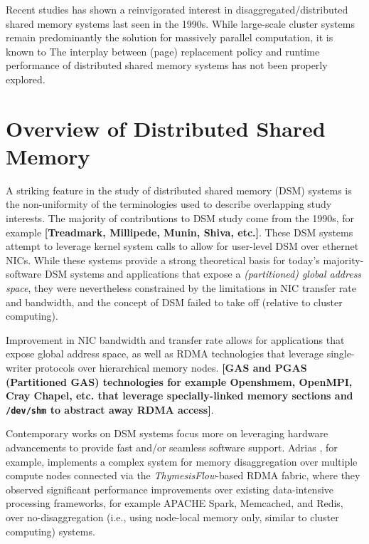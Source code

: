 \documentclass{article}
\begin{document}
Recent studies has shown a reinvigorated interest in disaggregated/distributed
shared memory systems last seen in the 1990s. While large-scale cluster systems
remain predominantly the solution for massively parallel computation, it is known
to 
The interplay between (page) replacement policy and runtime performance of
distributed shared memory systems has not been properly explored.

\section{Overview of Distributed Shared Memory}

A striking feature in the study of distributed shared memory (DSM) systems is the
non-uniformity of the terminologies used to describe overlapping study interests.
The majority of contributions to DSM study come from the 1990s, for example
\textbf{[Treadmark, Millipede, Munin, Shiva, etc.]}. These DSM systems attempt to
leverage kernel system calls to allow for user-level DSM over ethernet NICs. While
these systems provide a strong theoretical basis for today's majority-software
DSM systems and applications that expose a \emph{(partitioned) global address space},
they were nevertheless constrained by the limitations in NIC transfer rate and
bandwidth, and the concept of DSM failed to take off (relative to cluster computing).

Improvement in NIC bandwidth and transfer rate allows for applications that expose
global address space, as well as RDMA technologies that leverage single-writer
protocols over hierarchical memory nodes. \textbf{[GAS and PGAS (Partitioned GAS)
technologies for example Openshmem, OpenMPI, Cray Chapel, etc. that leverage
specially-linked memory sections and \texttt{/dev/shm} to abstract away RDMA access]}.


Contemporary works on DSM systems focus more on leveraging hardware advancements
to provide fast and/or seamless software support. Adrias \cite{Masouros_etal.Adrias.2023},
for example, implements a complex system for memory disaggregation over multiple
compute nodes connected via the \textit{ThymesisFlow}-based RDMA fabric, where
they observed significant performance improvements over existing data-intensive
processing frameworks, for example APACHE Spark, Memcached, and Redis, over
no-disaggregation (i.e., using node-local memory only, similar to cluster computing)
systems.
\end{document}
